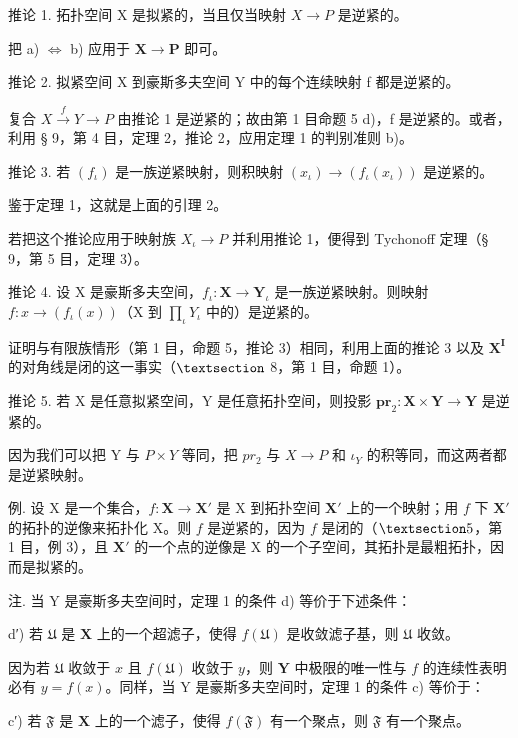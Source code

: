 推论 1. 拓扑空间 X 是拟紧的，当且仅当映射 \(X \rightarrow P\) 是逆紧的。

把 a) \(\Longleftrightarrow\) b) 应用于 \(\mathbf{X} \to \mathbf{P}\) 即可。

推论 2. 拟紧空间 X 到豪斯多夫空间 Y 中的每个连续映射 f 都是逆紧的。

复合 \(X \xrightarrow{f} Y \to P\) 由推论 1 是逆紧的；故由第 1 目命题 5 d)，f 是逆紧的。或者，利用 § 9，第 4 目，定理 2，推论 2，应用定理 1 的判别准则 b)。

推论 3. 若 \((f_{\iota})\) 是一族逆紧映射，则积映射 \((x_{\iota})\to (f_{\iota}(x_{\iota}))\) 是逆紧的。

鉴于定理 1，这就是上面的引理 2。

若把这个推论应用于映射族 \(X_{\iota} \rightarrow P\) 并利用推论 1，便得到 Tychonoff 定理（§ 9，第 5 目，定理 3）。

推论 4. 设 X 是豪斯多夫空间，\(f_{\iota}: \mathbf{X} \to \mathbf{Y}_{\iota}\) 是一族逆紧映射。则映射 \(f: x \to (f_{\iota}(x))\)（X 到 \(\prod_{\iota} Y_{\iota}\) 中的）是逆紧的。

证明与有限族情形（第 1 目，命题 5，推论 3）相同，利用上面的推论 3 以及 \(\mathbf{X}^{\mathbf{I}}\) 的对角线是闭的这一事实（\(\S\) 8，第 1 目，命题 1）。

推论 5. 若 X 是任意拟紧空间，Y 是任意拓扑空间，则投影 \(\mathbf{pr}_2: \mathbf{X} \times \mathbf{Y} \to \mathbf{Y}\) 是逆紧的。

因为我们可以把 Y 与 \(P \times Y\) 等同，把 \(pr_{2}\) 与 \(X \rightarrow P\) 和 \(\iota_{Y}\) 的积等同，而这两者都是逆紧映射。

例. 设 X 是一个集合，\(f: \mathbf{X} \to \mathbf{X}'\) 是 X 到拓扑空间 \(\mathbf{X}'\) 上的一个映射；用 \(f\) 下 \(\mathbf{X}'\) 的拓扑的逆像来拓扑化 X。则 \(f\) 是逆紧的，因为 \(f\) 是闭的（\(\S 5\)，第 1 目，例 3），且 \(\mathbf{X}'\) 的一个点的逆像是 X 的一个子空间，其拓扑是最粗拓扑，因而是拟紧的。

注. 当 Y 是豪斯多夫空间时，定理 1 的条件 d) 等价于下述条件：

d′) 若 \(\mathfrak{U}\) 是 \(\mathbf{X}\) 上的一个超滤子，使得 \(f(\mathfrak{U})\) 是收敛滤子基，则 \(\mathfrak{U}\) 收敛。

因为若 \(\mathfrak{U}\) 收敛于 \(x\) 且 \(f(\mathfrak{U})\) 收敛于 \(y\)，则 \(\mathbf{Y}\) 中极限的唯一性与 \(f\) 的连续性表明必有 \(y = f(x)\)。同样，当 Y 是豪斯多夫空间时，定理 1 的条件 c) 等价于：

c′) 若 \(\mathfrak{F}\) 是 \(\mathbf{X}\) 上的一个滤子，使得 \(f(\mathfrak{F})\) 有一个聚点，则 \(\mathfrak{F}\) 有一个聚点。

